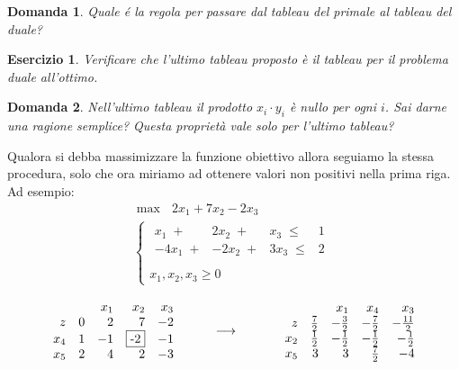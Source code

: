 \documentclass[10pt]{article}
\newtheorem{Dom}{Domanda}%
\newtheorem{Ese}{Esercizio}%
\begin{document}
\begin{Dom}
   Quale \'e la regola per passare dal tableau del primale
   al tableau del duale?
\end{Dom}

\begin{Ese}
   Verificare che l'ultimo tableau proposto
   \`e il tableau per il problema duale all'ottimo.
\end{Ese}

\begin{Dom}
   Nell'ultimo tableau il prodotto 
   $x_i\cdot y_i$ \`e nullo
   per ogni $i$. Sai darne una ragione semplice? 
   Questa propriet\`a vale solo per l'ultimo tableau?
\end{Dom}

Qualora si debba massimizzare la funzione obiettivo
allora seguiamo la stessa procedura,
solo che ora miriamo ad ottenere valori non positivi nella prima riga.
Ad esempio:
\[
   \begin{array}{l}
        \max \mbox{\ }2x_1 + 7x_2 -2x_3\\
        \left\{
        \begin{array}{l}
        \begin{array}{rrrr}
             x_1 \;+&  2x_2 \;+&  x_3 \;\leq &   1 \\
           -4x_1 \;+& -2x_2 \;+& 3x_3 \;\leq &   2 \\
        \end{array} \\
        x_1, x_2, x_3  \geq 0    
        \end{array}
        \right.
   \end{array}
\]

\[
  	\begin{array}{rrrrr}
  	&	& x_1  & x_2 & x_3  \\
  	z  & 0 & 2 &  7   &  -2 \\         
  	x_4 &  1 &  -1 &  \fbox{-2}   &  -1 \\
  	x_5 & 2 & 4 & 2 &  -3 \\
  	\end{array}
\hfill
\hspace{1cm}
{\longrightarrow}
\hfill
\hspace{1.2cm}
  	\begin{array}{rrrrr}
  	&	& x_1  & x_4 & x_3  \\
  	z  & \frac{7}{2} & -\frac{3}{2} &  -\frac{7}{2}   &  -\frac{11}{2} \\         
  	x_2 &  \frac{1}{2} &  -\frac{1}{2} &  -\frac{1}{2}   &  -\frac{1}{2} \\
  	x_5 & 3 & 3 & \frac{7}{2} &  -4 \\
  	\end{array}
\]
\end{document}
